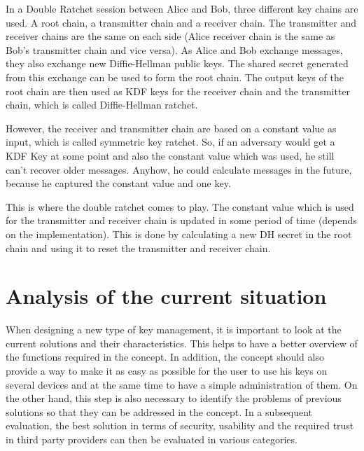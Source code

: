 \documentclass[12pt,oneside,a4paper,parskip]{scrbook}
\begin{document}
In a Double Ratchet session between Alice and Bob, three different key chains are used. A root chain, a transmitter chain and a receiver chain. The transmitter and receiver chains are the same on each side (Alice receiver chain is the same as Bob's transmitter chain and vice versa). As Alice and Bob exchange messages, they also exchange new Diffie-Hellman public keys. The shared secret generated from this exchange can be used to form the root chain. The output keys of the root chain are then used as KDF keys for the receiver chain and the transmitter chain, which is called Diffie-Hellman ratchet.

However, the receiver and transmitter chain are based on a constant value as input, which is called symmetric key ratchet. So, if an adversary would get a KDF Key at some point and also the constant value which was used, he still can't recover older messages. Anyhow, he could calculate messages in the future, because he captured the constant value and one key. 

This is where the double ratchet comes to play. The constant value which is used for the transmitter and receiver chain is updated in some period of time (depends on the implementation). This is done by calculating a new DH secret in the root chain and using it to reset the transmitter and receiver chain. 
\parencite{perrin_double_2016}




\chapter{Analysis of the current situation}

When designing a new type of key management, it is important to look at the current solutions and their characteristics. This helps to have a better overview of the functions required in the concept. In addition, the concept should also provide a way to make it as easy as possible for the user to use his keys on several devices and at the same time to have a simple administration of them. On the other hand, this step is also necessary to identify the problems of previous solutions so that they can be addressed in the concept. In a subsequent evaluation, the best solution in terms of security, usability and the required trust in third party providers can then be evaluated in various categories.
\end{document}
